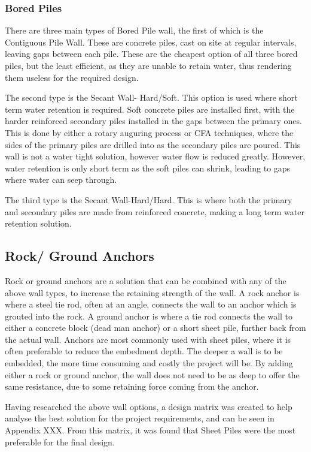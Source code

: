 \documentclass[12pt, a4paper]{article}
\begin{document}
\subsubsection{Bored Piles}
\begin{justify}
There are three main types of Bored Pile wall, the first of which is the Contiguous Pile Wall. These are concrete piles, cast on site at regular intervals, leaving gaps between each pile. These are the cheapest option of all three bored piles, but the least efficient, as they are unable to retain water, thus rendering them useless for the required design. 
\end{justify}
\begin{justify}
The second type is the Secant Wall- Hard/Soft. This option is used where short term water retention is required. Soft concrete piles are installed first, with the harder reinforced secondary piles installed in the gaps between the primary ones. This is done by either a rotary auguring process or CFA techniques, where the sides of the primary piles are drilled into as the secondary piles are poured. This wall is not a water tight solution, however water flow is reduced greatly. However, water retention is only short term as the soft piles can shrink, leading to gaps where water can seep through. 
\end{justify}
\begin{justify}
The third type is the Secant Wall-Hard/Hard. This is where both the primary and secondary piles are made from reinforced concrete, making a long term water retention solution.
\end{justify}
\subsection{Rock/ Ground Anchors}
\begin{justify}
Rock or ground anchors are a solution that can be combined with any of the above wall types, to increase the retaining strength of the wall. A rock anchor is where a steel tie rod, often at an angle, connects the wall to an anchor which is grouted into the rock. A ground anchor is where a tie rod connects the wall to either a concrete block (dead man anchor) or a short sheet pile, further back from the actual wall. Anchors are most commonly used with sheet piles, where it is often preferable to reduce the embedment depth. The deeper a wall is to be embedded, the more time consuming and costly the project will be. By adding either a rock or ground anchor, the wall does not need to be as deep to offer the same resistance, due to some retaining force coming from the anchor.
\end{justify}
\begin{justify}
Having researched the above wall options, a design matrix was created to help analyse the best solution for the project requirements, and can be seen in Appendix XXX. From this matrix, it was found that Sheet Piles were the most preferable for the final design. 
\end{justify}
\end{document}
